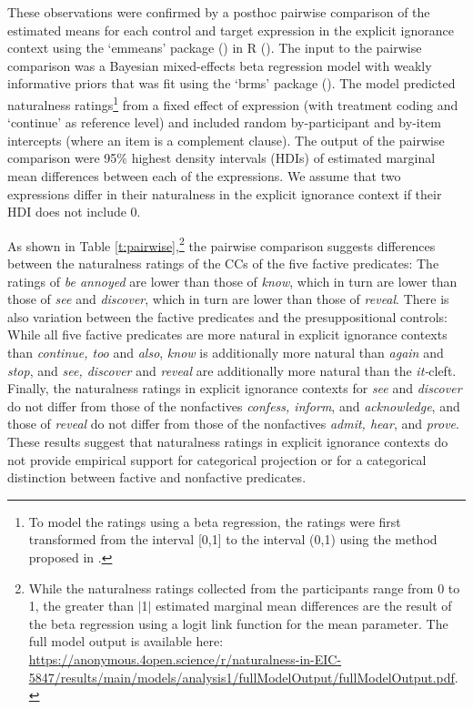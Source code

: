 \documentclass[11pt,fleqn]{article}
\newcommand{\6}{\mbox{$[\hspace*{-.6mm}[$}}
\newcommand{\9}{\mbox{$]\hspace*{-.6mm}]$}}
\begin{document}
These observations were confirmed by a posthoc pairwise comparison of the estimated means for each control and target expression in the explicit ignorance context using the `emmeans' package (\citealt{emmeans}) in R (\citealt{r}). The input to the pairwise comparison was a Bayesian mixed-effects beta regression model with weakly informative priors that was fit using the `brms' package (\citealt{buerkner2017}). The model predicted naturalness ratings\footnote{\label{fn:transform}To model the ratings using a beta regression, the ratings were first transformed from the interval [0,1] to the interval (0,1) using the method proposed in \citealt{smithson-verkuilen2006}.} from a fixed effect of expression (with treatment coding and `continue' as reference level) and included random by-participant and by-item intercepts (where an item is a complement clause). The output of the pairwise comparison were 95\% highest density intervals (HDIs) of estimated marginal mean differences between each of the expressions. We assume that two expressions differ in their naturalness in the explicit ignorance context if their HDI does not include 0.

As shown in Table \ref{t:pairwise},\footnote{While the naturalness ratings collected from the participants range from 0 to 1, the greater than $|$1$|$  estimated marginal mean differences are the result of the beta regression using a logit link function for the mean parameter. The full model output is available here: \url{https://anonymous.4open.science/r/naturalness-in-EIC-5847/results/main/models/analysis1/fullModelOutput/fullModelOutput.pdf}.} the pairwise comparison suggests differences between the naturalness ratings of the CCs of the five factive predicates: The ratings of {\em be annoyed} are lower than those of {\em know}, which in turn are lower than those of {\em see} and {\em discover}, which in turn are lower than those of {\em reveal}. There is also variation between the factive predicates and the presuppositional controls: While all five factive predicates are more natural in explicit ignorance contexts than {\em continue, too} and {\em also}, {\em know} is additionally more natural than {\em again} and {\em stop}, and {\em see, discover} and {\em reveal} are additionally more natural than the {\em it-}cleft. Finally, the naturalness ratings in explicit ignorance contexts for {\em see} and {\em discover} do not differ from those of the nonfactives {\em confess, inform}, and {\em acknowledge}, and those of {\em reveal} do not differ from those of the nonfactives {\em admit, hear}, and {\em prove}. These results suggest that naturalness ratings in explicit ignorance contexts do not provide empirical support for categorical projection or for a categorical distinction between factive and nonfactive predicates. 
\end{document}
